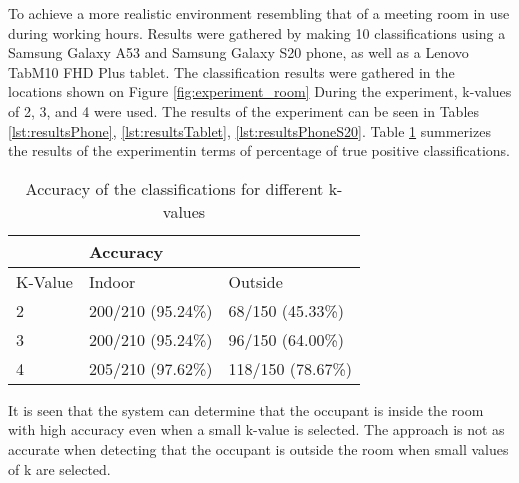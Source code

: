 To achieve a more realistic environment resembling that of a meeting room in use during working hours. 
Results were gathered by making 10 classifications using a Samsung Galaxy A53 and Samsung Galaxy S20 phone, as well as a Lenovo TabM10 FHD Plus tablet. The classification results were gathered  in the locations shown on Figure \ref{fig:experiment_room}
During the experiment, k-values of 2, 3, and 4 were used.  
The results of the experiment can be seen in Tables \ref{lst:resultsPhone}, \ref{lst:resultsTablet}, \ref{lst:resultsPhoneS20}.
Table \ref{lst:resultsPhone_precision} summerizes the results of the experimentin terms of percentage of true positive classifications. 

\begin{table}[H]
    \centering
    \begin{tabular}{|l|ll|}
    \hline
            & \multicolumn{2}{l|}{Accuracy}                      \\ \hline
    K-Value & \multicolumn{1}{l|}{Indoor}          & Outside      \\ \hline
    2       & \multicolumn{1}{l|}{200/210 (95.24\%)} & 68/150 (45.33\%) \\ \hline
    3       & \multicolumn{1}{l|}{200/210 (95.24\%)} & 96/150 (64.00\%) \\ \hline
    4       & \multicolumn{1}{l|}{205/210 (97.62\%)} & 118/150 (78.67\%) \\ \hline   
    \end{tabular}
    \caption{Accuracy of the classifications for different k-values}
    \label{lst:resultsPhone_precision}
\end{table}
It is seen that the system can determine that the occupant is inside the room with high accuracy even when a small k-value is selected. The approach is not as accurate when detecting that the occupant is outside the room when small values of k are selected.  